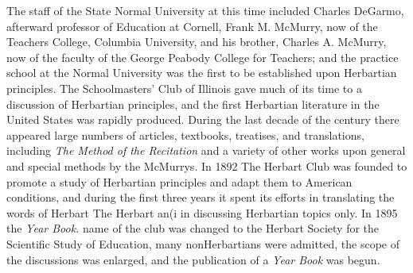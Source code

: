 \documentclass[]{book}
\begin{document}
The staff of the State Normal University at this time included Charles DeGarmo, afterward professor of Education at Cornell, Frank M. McMurry, now of the Teachers College, Columbia University, and his brother, Charles A. McMurry, now of the faculty of the George Peabody College for Teachers; and the practice school at the Normal University was the first to be established upon Herbartian principles. The Schoolmasters' Club of Illinois gave much of its time to a discussion of Herbartian principles, and the first Herbartian literature in the United States was rapidly produced. During the last decade of the century there appeared large numbers of articles, textbooks, treatises, and translations, including \emph{The Method of the Recitation} and a variety of other works upon general and special methods by the McMurrys. In 1892 The Herbart Club was founded to promote a study of Herbartian principles and adapt them to American conditions, and during the first three years it spent its efforts in translating the words of Herbart The Herbart an(i in discussing Herbartian topics only. In 1895 the \emph{Year Book.} name of the club was changed to the Herbart Society for the Scientific Study of Education, many nonHerbartians were admitted, the scope of the discussions was enlarged, and the publication of a \emph{Year Book} was begun.
\end{document}
